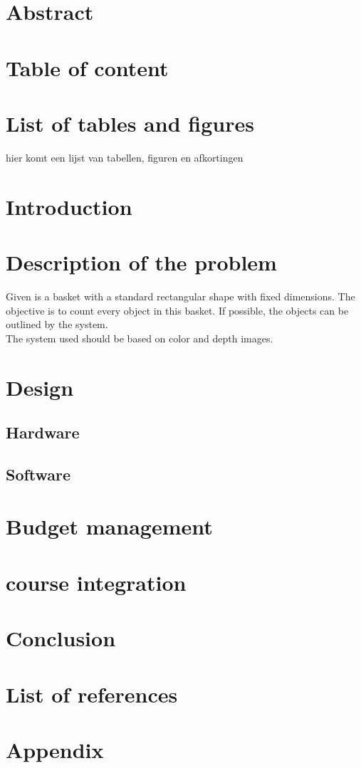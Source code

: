 \documentclass{article}
\begin{document}
\section{Abstract}
\section{Table of content}
\section{List of tables and figures}
hier komt een lijst van tabellen, figuren en afkortingen
\section{Introduction}

\section{Description of the problem}

\hspace{\parindent} Given is a basket with a standard rectangular shape with fixed dimensions. The objective is to count every object in this basket. If possible, the objects can be outlined by the system.\\

\noindent The system used should be based on color and depth images.


\section{Design}
\subsection{Hardware}
\subsection{Software}

\section{Budget management}
\section{course integration}
\section{Conclusion}
\section{List of references}
\section{Appendix}
\end{document}
